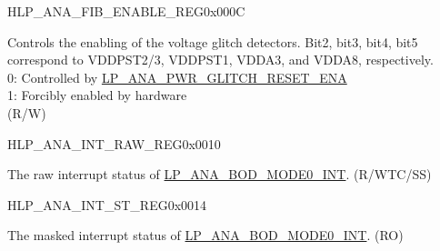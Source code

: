     \begin{register}{H}{LP\_ANA\_FIB\_ENABLE\_REG}{0x000C}\label{regdesc:LPANAFIBENABLEREG}
    \regnewline%
    \begin{regdesc}\begin{reglist}
    \label{fielddesc:LPANAANAFIBENA}\item [LP\_ANA\_ANA\_FIB\_ENA]  Controls the enabling of the voltage glitch detectors. Bit2, bit3, bit4, bit5 correspond to VDDPST2/3, VDDPST1, VDDA3, and VDDA8, respectively.\\
    0: Controlled by \hyperref[fielddesc:LPANAPWRGLITCHRESETENA]{LP\_ANA\_PWR\_GLITCH\_RESET\_ENA} \\
    1: Forcibly enabled by hardware\\
    (R/W)
    \end{reglist}\end{regdesc}
    \end{register}

    \begin{register}{H}{LP\_ANA\_INT\_RAW\_REG}{0x0010}\label{regdesc:LPANAINTRAWREG}
    \regnewline%
    \begin{regdesc}\begin{reglist}
    \label{fielddesc:LPANABODMODE0INTRAW}\item [LP\_ANA\_BOD\_MODE0\_INT\_RAW] The raw interrupt status of \hyperref[int:LPANABODMODE0INT]{LP\_ANA\_BOD\_MODE0\_INT}. (R/WTC/SS)
    \end{reglist}\end{regdesc}
    \end{register}

    \begin{register}{H}{LP\_ANA\_INT\_ST\_REG}{0x0014}\label{regdesc:LPANAINTSTREG}
    \regnewline%
    \begin{regdesc}\begin{reglist}
    \label{fielddesc:LPANABODMODE0INTST}\item [LP\_ANA\_BOD\_MODE0\_INT\_ST] The masked interrupt status of \hyperref[int:LPANABODMODE0INT]{LP\_ANA\_BOD\_MODE0\_INT}. (RO)
    \end{reglist}\end{regdesc}
    \end{register}

